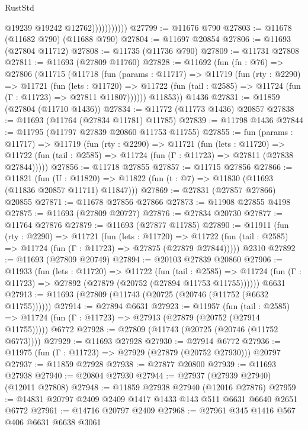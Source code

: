 \begin{lexlean}{RustStd}
\begin{coremodule}
                          @19239
                          @19242
                          @12762)))))))))))
@27799 := @11676 @790
@27803 := @11678 (@11682 @790) (@11688 @790)
@27804 := @11697 @20854
@27806 := @11693 (@27804 @11712)
@27808 := @11735 (@11736 @790)
@27809 := @11731 @27808
@27811 := @11693 (@27809 @11760)
@27828 := @11692
    (fun (fn : @76) =>
    @27806
      (@11715
        (@11718
          (fun (params : @11717) =>
          @11719
            (fun (rty : @2290) =>
            @11721
              (fun (lets : @11720) =>
              @11722 (fun (tail : @2585) => @11724 (fun (Γ : @11723) => @27811 @11807))))))
        @11853))
    @1436
@27831 := @11859 (@27804 (@11710 @1436))
@27834 := @11772 (@11773 @1436) @20857
@27838 := @11693 (@11764 (@27834 @11781) @11785)
@27839 := @11798 @1436
@27844 := @11795 (@11797 @27839 @20860 @11753 @11755)
@27855 := fun (params : @11717) =>
  @11719
    (fun (rty : @2290) =>
    @11721
      (fun (lets : @11720) =>
      @11722 (fun (tail : @2585) => @11724 (fun (Γ : @11723) => @27811 (@27838 @27844)))))
@27856 := @11718 @27855
@27857 := @11715 @27856
@27866 := @11821
    (fun (U : @11820) => @11822 (fun (t : @7) => @11830 (@11693 (@11836 @20857 @11711) @11847)))
@27869 := @27831 (@27857 @27866) @20855
@27871 := @11678 @27856 @27866
@27873 := @11908 @27855 @4198
@27875 := @11693 (@27809 @20727)
@27876 := @27834 @20730
@27877 := @11764 @27876
@27879 := @11693 (@27877 @11785)
@27890 := @11911
    (fun (rty : @2290) =>
    @11721
      (fun (lets : @11720) =>
      @11722 (fun (tail : @2585) => @11724 (fun (Γ : @11723) => @27875 (@27879 @27844)))))
    @2310
@27892 := @11693 (@27809 @20749)
@27894 := @20103 @27839 @20860
@27906 := @11933
    (fun (lets : @11720) =>
    @11722
      (fun (tail : @2585) =>
      @11724 (fun (Γ : @11723) => @27892 (@27879 (@20752 (@27894 @11753 @11755))))))
    @6631
@27913 := @11693 (@27809 (@11743 (@20725 (@20746 (@11752 (@6632 @11755))))))
@27914 := @27894 @6631
@27923 := @11957
    (fun (tail : @2585) => @11724 (fun (Γ : @11723) => @27913 (@27879 (@20752 (@27914 @11755)))))
    @6772
@27928 := @27809 (@11743 (@20725 (@20746 (@11752 @6773))))
@27929 := @11693 @27928
@27930 := @27914 @6772
@27936 := @11975 (fun (Γ : @11723) => @27929 (@27879 (@20752 @27930))) @20797
@27937 := @11859 @27928
@27938 := @27877 @20800
@27939 := @11693 @27938
@27940 := @20804 @27930
@27944 := @27937 (@27939 @27940) (@12011 @27808)
@27948 := @11859 @27938 @27940 (@12016 @27876)
@27959 := @14831 @20797 @2409 @2409 @1417 @1433 @143 @511 @6631 @6640 @2651 @6772
@27961 := @14716 @20797 @2409
@27968 := @27961 @345 @1416 @567 @406 @6631 @6638 @3061

\end{coremodule}
\end{lexlean}
